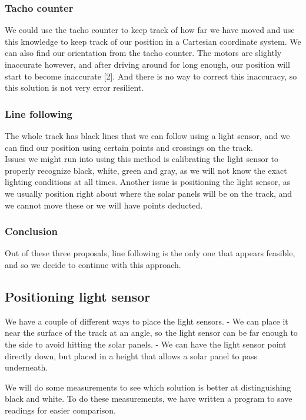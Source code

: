 \subsubsection{Tacho counter}

We could use the tacho counter to keep track of how far we have moved
and use this knowledge to keep track of our position in a Cartesian
coordinate system. We can also find our orientation from the tacho
counter. The motors are slightly inaccurate however, and after driving
around for long enough, our position will start to become inaccurate
{[}2{]}. And there is no way to correct this inaccuracy, so this
solution is not very error resilient.

\subsubsection{Line following}

The whole track has black lines that we can follow using a light sensor,
and we can find our position using certain points and crossings on the
track.\\Issues we might run into using this method is calibrating the
light sensor to properly recognize black, white, green and gray, as we
will not know the exact lighting conditions at all times. Another issue
is positioning the light sensor, as we usually position right about
where the solar panels will be on the track, and we cannot move these or
we will have points deducted.

\subsubsection{Conclusion}

Out of these three proposals, line following is the only one that
appears feasible, and so we decide to continue with this approach.

\subsection{Positioning light sensor}

We have a couple of different ways to place the light sensors. - We can
place it near the surface of the track at an angle, so the light sensor
can be far enough to the side to avoid hitting the solar panels. - We
can have the light sensor point directly down, but placed in a height
that allows a solar panel to pass underneath.

We will do some measurements to see which solution is better at
distinguishing black and white. To do these measurements, we have
written a program to save readings for easier comparison.

